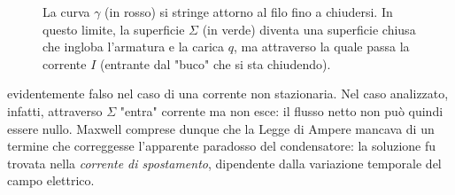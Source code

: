 \documentclass[a4paper,11pt]{report}
\begin{document}
\begin{figure}[htbp]
    \caption{La curva $\gamma$ (in rosso) si stringe attorno al filo fino a chiudersi. In questo limite, la superficie $\Sigma$ (in verde) diventa una superficie chiusa che ingloba l'armatura e la carica $q$, ma attraverso la quale passa la corrente $I$ (entrante dal "buco" che si sta chiudendo).}
    \label{fig:ragionamento_limite}
\end{figure}
evidentemente falso nel caso di una corrente non stazionaria. Nel caso analizzato, infatti, attraverso $\Sigma$ "entra" corrente ma non esce: il flusso netto non può quindi essere nullo. Maxwell comprese dunque che la Legge di Ampere mancava di un termine che correggesse l'apparente paradosso del condensatore: la soluzione fu trovata nella \textit{corrente di spostamento}, dipendente dalla variazione temporale del campo elettrico.
\end{document}
